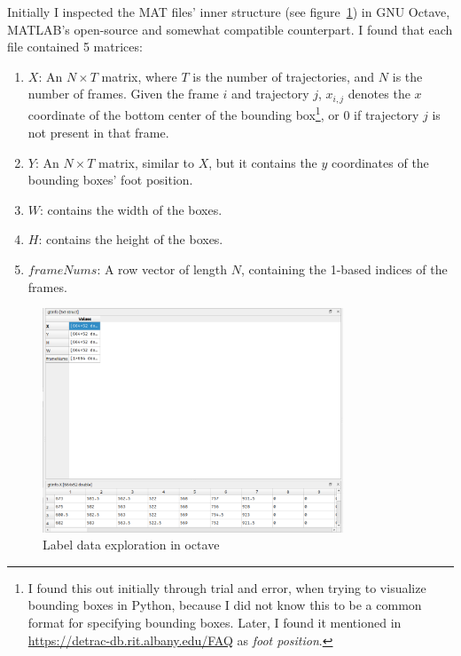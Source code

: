 Initially I inspected the MAT files' inner structure (see figure~\ref{fig:octave-exploration}) in GNU Octave, MATLAB's open-source and somewhat compatible counterpart. I found that each file contained 5 matrices:
\begin{enumerate}
    \item{$X$: An $N \times T$ matrix, where $T$ is the number of trajectories, and $N$ is the number of frames. Given the frame $i$ and trajectory $j$, $x_{i,j}$ denotes the $x$ coordinate of the bottom center of the bounding box\footnote{I found this out initially through trial and error, when trying to visualize bounding boxes in Python, because I did not know this to be a common format for specifying bounding boxes. Later, I found it mentioned in \url{https://detrac-db.rit.albany.edu/FAQ} as \textit{foot position}.}, or $0$ if trajectory $j$ is not present in that frame.}
    \item{$Y$: An $N \times T$ matrix, similar to $X$, but it contains the $y$ coordinates of the bounding boxes' foot position.}
    \item{$W$: contains the width of the boxes.}
    \item{$H$: contains the height of the boxes.}
    \item{$frameNums$: A row vector of length $N$, containing the 1-based indices of the frames.}
\end{enumerate}

\begin{figure}[h]
    \begin{center}
        \captionsetup{width=0.8\textwidth}
        \includegraphics[width=0.8\textwidth]{figures/octave.png}
        \caption{Label data exploration in octave}
        \label{fig:octave-exploration}
    \end{center}
\end{figure}


